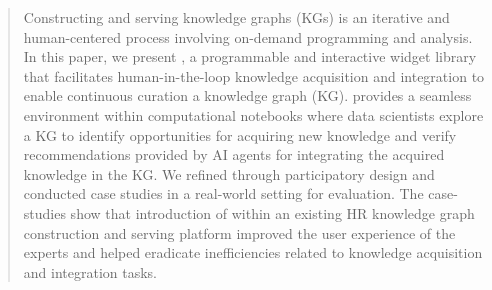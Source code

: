 \begin{abstract}
Constructing and serving knowledge graphs (KGs)
is an iterative
and human-centered process involving
on-demand programming and analysis.
In this paper, we present \system, a programmable and interactive widget 
library that facilitates human-in-the-loop knowledge acquisition and integration to enable
continuous curation a knowledge graph (KG). 
\system provides a seamless environment within computational notebooks where
data scientists explore a KG to identify opportunities for acquiring new knowledge and 
verify recommendations provided by AI agents for integrating the acquired knowledge in the KG.
We refined \system through participatory
design and conducted case studies
in a real-world setting for evaluation.
The case-studies show that introduction of \system
within an existing HR knowledge graph construction and serving platform
improved the user experience of the experts and helped eradicate inefficiencies
related to knowledge acquisition and integration tasks.


\end{abstract}

% 



 